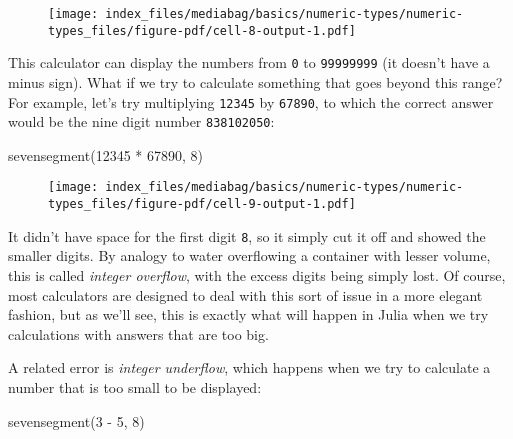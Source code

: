 \documentclass[
  letterpaper,
  DIV=11,
  numbers=noendperiod]{scrreprt}
\newenvironment{Shaded}{\begin{snugshade}}{\end{snugshade}}
\newcommand{\FloatTok}[1]{\textcolor[rgb]{0.68,0.00,0.00}{#1}}
\newcommand{\FunctionTok}[1]{\textcolor[rgb]{0.28,0.35,0.67}{#1}}
\newcommand{\NormalTok}[1]{\textcolor[rgb]{0.00,0.23,0.31}{#1}}
\newcommand{\OperatorTok}[1]{\textcolor[rgb]{0.37,0.37,0.37}{#1}}
\begin{document}
\begin{figure}[H]

{\centering \texttt{[image: index\_files/mediabag/basics/numeric-types/numeric-types\_files/figure-pdf/cell-8-output-1.pdf]}

}

\end{figure}

This calculator can display the numbers from \texttt{0} to
\texttt{99999999} (it doesn't have a minus sign). What if we try to
calculate something that goes beyond this range? For example, let's try
multiplying \texttt{12345} by \texttt{67890}, to which the correct
answer would be the nine digit number \texttt{838102050}:

\begin{Shaded}
\begin{Highlighting}[]
\FunctionTok{sevensegment}\NormalTok{(}\FloatTok{12345} \OperatorTok{*} \FloatTok{67890}\NormalTok{, }\FloatTok{8}\NormalTok{)}
\end{Highlighting}
\end{Shaded}

\begin{figure}[H]

{\centering \texttt{[image: index\_files/mediabag/basics/numeric-types/numeric-types\_files/figure-pdf/cell-9-output-1.pdf]}

}

\end{figure}

It didn't have space for the first digit \texttt{8}, so it simply cut it
off and showed the smaller digits. By analogy to water overflowing a
container with lesser volume, this is called \emph{integer overflow},
with the excess digits being simply lost. Of course, most calculators
are designed to deal with this sort of issue in a more elegant fashion,
but as we'll see, this is exactly what will happen in Julia when we try
calculations with answers that are too big.

A related error is \emph{integer underflow}, which happens when we try
to calculate a number that is too small to be displayed:

\begin{Shaded}
\begin{Highlighting}[]
\FunctionTok{sevensegment}\NormalTok{(}\FloatTok{3} \OperatorTok{{-}} \FloatTok{5}\NormalTok{, }\FloatTok{8}\NormalTok{)}
\end{Highlighting}
\end{Shaded}
\end{document}
